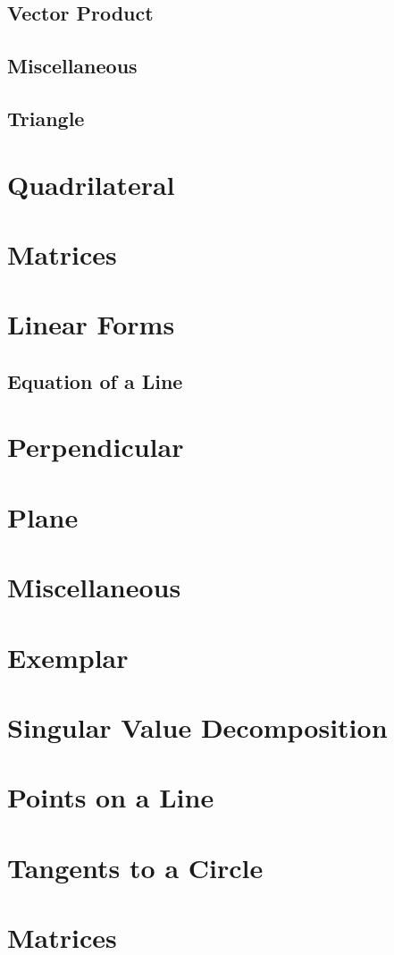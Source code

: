 \documentclass[journal]{IEEEtran}
\begin{document}
\subsection{Vector Product}

\newpage
\subsection{Miscellaneous}

\newpage
\subsection{Triangle}

\newpage
\section{ Quadrilateral}

\newpage
\section{Matrices}

\newpage
\section{Linear Forms}
\subsection{Equation of a Line}

\newpage
\section{Perpendicular}
%
\newpage
\section{Plane}
%
\newpage
\section{Miscellaneous }
%
\newpage
\section{Exemplar}
%
\newpage
\section{Singular Value Decomposition}
%
\appendices
\section{Points on a Line}

\newpage
\section{Tangents to a Circle}

\section{Matrices}

\end{document}

